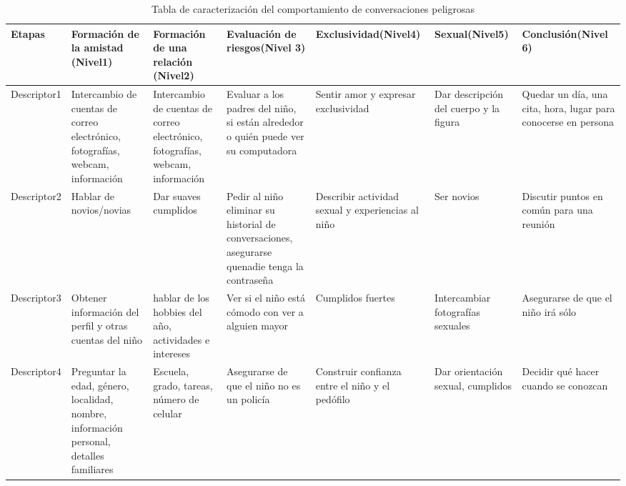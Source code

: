 \begin{table}[!h]

\begin{tabular}[t]{|p{15mm} |p{22mm} |p{22mm} |p{22mm} |p{20mm} |p{20mm} |p{20mm} |}
\hline
\hline
Etapas & Formaci\'on de la amistad (Nivel1) & Formaci\'on de una relaci\'on (Nivel2) & Evaluaci\'on de riesgos(Nivel 3) & Exclusividad(Nivel4) & Sexual(Nivel5) & Conclusi\'on(Nivel 6) \\
\hline
Descriptor1 & Intercambio de cuentas de correo electr\'onico, fotograf\'ias, webcam, informaci\'on & Intercambio de cuentas de correo electr\'onico, fotograf\'ias, webcam, informaci\'on & Evaluar a los padres del ni\~no, si est\'an alrededor o qui\'en puede ver su computadora & Sentir amor y expresar exclusividad & Dar descripci\'on del cuerpo y la figura & Quedar un d\'ia, una cita, hora, lugar para conocerse en persona \\
\hline
Descriptor2 &Hablar de novios/novias & Dar suaves cumplidos & Pedir al ni\~no eliminar su historial de conversaciones, asegurarse quenadie tenga la contrase\~na & Describir actividad sexual y experiencias al ni\~no &Ser novios &Discutir puntos en com\'un para una reuni\'on \\
\hline
Descriptor3 &Obtener informaci\'on del perfil y otras cuentas del ni\~no & hablar de los hobbies del a\~no, actividades e intereses & Ver si el ni\~no est\'a c\'omodo con ver a alguien mayor& Cumplidos fuertes & Intercambiar fotograf\'ias sexuales & Asegurarse de que el ni\~no ir\'a s\'olo \\
\hline
Descriptor4 & Preguntar la edad, g\'enero, localidad, nombre, informaci\'on personal, detalles familiares & Escuela, grado, tareas, n\'umero de celular & Asegurarse de que el ni\~no no es un polic\'ia & Construir confianza entre el ni\~no y el ped\'ofilo & Dar orientaci\'on sexual, cumplidos & Decidir qu\'e hacer cuando se conozcan\\
\hline
\end{tabular} \\ \\ \\
\caption{Tabla de caracterizaci\'on del comportamiento de conversaciones peligrosas}
\label{table:caracterizacion}
\end{table}






